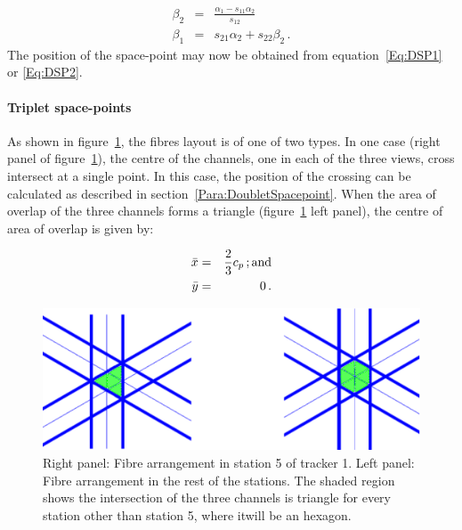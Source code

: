 \begin{eqnarray}
  \beta_2 & = & \frac{\alpha_1 - s_{11} \alpha_2}{s_{12}}     \\
  \beta_1 & = & s_{21} \alpha_2 + s_{22} \beta_2 \, .
\end{eqnarray}
The position of the space-point may now be obtained from equation~\ref{Eq:DSP1} or \ref{Eq:DSP2}.

\paragraph{Triplet space-points}

As shown in figure~\ref{Fig:SenseArea}, the fibres layout is of one of two types. In one case (right panel of figure~\ref{Fig:SenseArea}), the centre of the channels, one in each of the three views, cross intersect at a single point. In this case, the position of the crossing can be calculated as described in section~\ref{Para:DoubletSpacepoint}. When the area of overlap of the three channels forms a triangle (figure~\ref{Fig:SenseArea} left panel), the centre of area of overlap is given by:

\begin{eqnarray}
  \bar{x} & = & \frac{2}{3}c_p \, {\rm ; and}       \\
  \bar{y} & = & 0 \, .
\end{eqnarray}

\begin{figure}
  \begin{center}
    \includegraphics[width=0.7\linewidth]{detectors/tracker/04-Reconstruction/04-02-Space-points/Figures/SpacepointError.pdf}
  \end{center}
  \caption{Right panel: Fibre arrangement in station 5 of tracker 1. Left panel: Fibre arrangement in the rest of the stations. The shaded region shows the intersection of the three channels is triangle for every station other than station 5, where itwill be an hexagon.}
  \label{Fig:SenseArea}
\end{figure}
